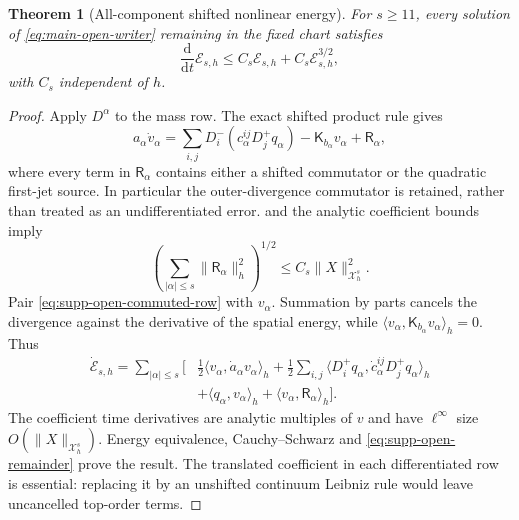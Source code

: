 \documentclass[11pt]{article}
\newtheorem{theorem}{Theorem}[section]
\theoremstyle{definition}
\theoremstyle{remark}
\newcommand{\dd}{\mathrm d}
\begin{document}
\begin{theorem}[All-component shifted nonlinear energy]
\label{thm:supp-open-energy}
For $s\ge11$, every solution of \eqref{eq:main-open-writer} remaining in the
fixed chart satisfies
\begin{equation}
 \boxed{\frac{\dd}{\dd t}\mathscr E_{s,h}
 \le C_s\mathscr E_{s,h}+C_s\mathscr E_{s,h}^{3/2},}
 \label{eq:supp-open-energy-inequality}
\end{equation}
with $C_s$ independent of $h$.
\end{theorem}
\begin{proof}
Apply $D^\alpha$ to the mass row.  The exact shifted product rule gives
\begin{equation}
 a_\alpha\dot v_\alpha
 =\sum_{i,j}D_i^-(c_\alpha^{ij}D_j^+q_\alpha)
 -\mathsf K_{b_\alpha}v_\alpha+\mathsf R_\alpha,
 \label{eq:supp-open-commuted-row}
\end{equation}
where every term in $\mathsf R_\alpha$ contains either a shifted commutator
or the quadratic first-jet source.  In particular the outer-divergence
commutator is retained, rather than treated as an undifferentiated error.
 and the analytic coefficient bounds imply
\begin{equation}
 \left(\sum_{|\alpha|\le s}\|\mathsf R_\alpha\|_h^2\right)^{1/2}
 \le C_s\|X\|_{\mathcal X_h^s}^2.
 \label{eq:supp-open-remainder}
\end{equation}
Pair \eqref{eq:supp-open-commuted-row} with $v_\alpha$.
Summation by parts cancels the divergence against the derivative of the
spatial energy, while
$\langle v_\alpha,\mathsf K_{b_\alpha}v_\alpha\rangle_h=0$.  Thus
\begin{equation}
 \begin{split}
 \dot{\mathscr E}_{s,h}=\sum_{|\alpha|\le s}\bigg[&
 \tfrac12\langle v_\alpha,\dot a_\alpha v_\alpha\rangle_h
 +\tfrac12\sum_{i,j}\langle D_i^+q_\alpha,
          \dot c_\alpha^{ij}D_j^+q_\alpha\rangle_h\\
 &+\langle q_\alpha,v_\alpha\rangle_h
 +\langle v_\alpha,\mathsf R_\alpha\rangle_h\bigg].
 \end{split}
 \label{eq:supp-open-energy-identity}
\end{equation}
The coefficient time derivatives are analytic multiples of $v$ and have
$\ell^\infty$ size $O(\|X\|_{\mathcal X_h^s})$.  Energy equivalence,
Cauchy--Schwarz and \eqref{eq:supp-open-remainder} prove the result.  The
translated coefficient in each differentiated row is essential: replacing
it by an unshifted continuum Leibniz rule would leave uncancelled top-order
terms.
\end{proof}
\end{document}
